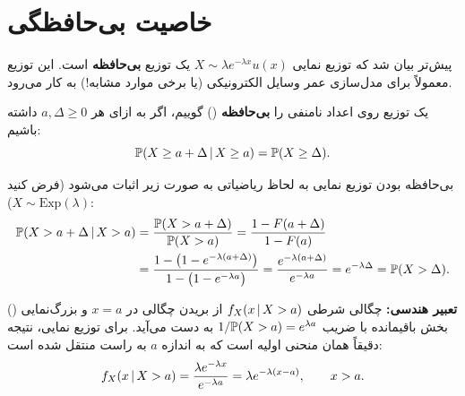 \section{خاصیت بی‌حافظگی }

پیش‌تر بیان شد که توزیع نمایی $X\sim\lambda e^{-\lambda x}u(x)$ یک توزیع \textbf{بی‌حافظه} است. این توزیع معمولاً برای مدل‌سازی عمر وسایل الکترونیکی (یا برخی موارد مشابه!) به کار می‌رود.

\begin{definition}[بی‌حافظگی]
یک توزیع روی اعداد نامنفی را \textbf{بی‌حافظه} () گوییم، اگر به ازای هر $a,\Delta\ge0$ داشته باشیم:
\[
\mathbb{P}(X\ge a+\Delta\,|\, X\ge a)=\mathbb{P}(X\ge\Delta).
\]
\end{definition}

بی‌حافظه بودن توزیع نمایی به لحاظ ریاضیاتی به صورت زیر اثبات می‌شود (فرض کنید $X\sim\mathrm{Exp}(\lambda)$):
\[
\begin{aligned}
\mathbb{P}(X>a+\Delta\,|\, X>a)&=\frac{\mathbb{P}(X>a+\Delta)}{\mathbb{P}(X>a)}=\frac{1-F(a+\Delta)}{1-F(a)}\\
&=\frac{1-\big(1-e^{-\lambda(a+\Delta)}\big)}{1-\big(1-e^{-\lambda a}\big)}=\frac{e^{-\lambda(a+\Delta)}}{e^{-\lambda a}}=e^{-\lambda\Delta}=\mathbb{P}(X>\Delta).
\end{aligned}
\]

\textbf{تعبیر هندسی:} چگالی شرطی $f_X(x\,|\, X>a)$ از بریدن چگالی در $x=a$ و بزرگ‌نمایی () بخش باقیمانده با ضریب $1/\mathbb{P}(X>a)=e^{\lambda a}$ به دست می‌آید. برای توزیع نمایی، نتیجه دقیقاً همان منحنی اولیه است که به اندازه $a$ به راست منتقل شده است:
\[
f_X(x\,|\, X>a)=\frac{\lambda e^{-\lambda x}}{e^{-\lambda a}}=\lambda e^{-\lambda(x-a)},\qquad x>a .
\]

\begin{center}
\end{center}

